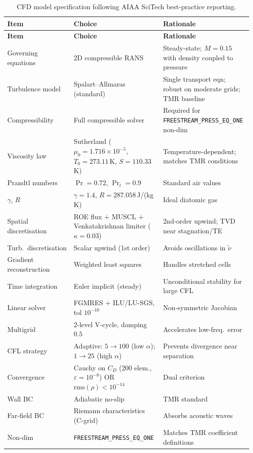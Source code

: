 \documentclass[11pt,a4paper]{article}
\begin{document}
\begin{longtable}{p{3.2cm}p{5cm}p{5.5cm}}
\caption{CFD model specification following AIAA SciTech best-practice reporting.}
\label{tab:cfd_spec} \\
\toprule
\textbf{Item} & \textbf{Choice} & \textbf{Rationale} \\
\midrule
\endfirsthead
\toprule
\textbf{Item} & \textbf{Choice} & \textbf{Rationale} \\
\midrule
\endhead
Governing equations &
  2D compressible RANS &
  Steady-state; $M=0.15$ with density coupled to pressure \\
Turbulence model &
  Spalart--Allmaras (standard) \cite{SpalartAllmaras1992} &
  Single transport eqn; robust on moderate grids; TMR baseline \\
Compressibility &
  Full compressible solver &
  Required for \texttt{FREESTREAM\_PRESS\_EQ\_ONE} non-dim \\
Viscosity law &
  Sutherland ($\mu_0{=}1.716{\times}10^{-5}$, $T_0{=}273.11$\,K, $S{=}110.33$\,K) &
  Temperature-dependent; matches TMR conditions \\
Prandtl numbers &
  $\Pr{=}0.72$, $\Pr_t{=}0.9$ &
  Standard air values \\
$\gamma$, $R$ &
  $\gamma{=}1.4$, $R{=}287.058$\,J/(kg\,K) &
  Ideal diatomic gas \\
Spatial discretisation &
  ROE flux $+$ MUSCL $+$ Venkatakrishnan limiter ($\kappa{=}0.03$) &
  2nd-order upwind; TVD near stagnation/TE \\
Turb.\ discretisation &
  Scalar upwind (1st order) &
  Avoids oscillations in $\tilde\nu$ \\
Gradient reconstruction &
  Weighted least squares &
  Handles stretched cells \\
Time integration &
  Euler implicit (steady) &
  Unconditional stability for large CFL \\
Linear solver &
  FGMRES $+$ ILU/LU-SGS, tol $10^{-10}$ &
  Non-symmetric Jacobian \\
Multigrid &
  2-level V-cycle, damping $0.5$ &
  Accelerates low-freq.\ error \\
CFL strategy &
  Adaptive: $5{\to}100$ (low $\alpha$); $1{\to}25$ (high $\alpha$) &
  Prevents divergence near separation \\
Convergence &
  Cauchy on $C_D$ (200 elem., $\varepsilon{=}10^{-8}$) OR $\text{rms}(\rho)<10^{-14}$ &
  Dual criterion \\
Wall BC &
  Adiabatic no-slip &
  TMR standard \\
Far-field BC &
  Riemann characteristics (C-grid) &
  Absorbs acoustic waves \\
Non-dim &
  \texttt{FREESTREAM\_PRESS\_EQ\_ONE} &
  Matches TMR coefficient definitions \\
\bottomrule
\end{longtable}
\end{document}
